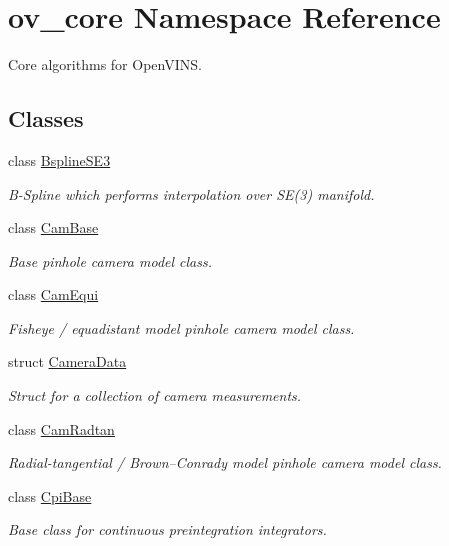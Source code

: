\hypertarget{namespaceov__core}{}\section{ov\+\_\+core Namespace Reference}
\label{namespaceov__core}


Core algorithms for Open\+V\+I\+NS.  


\subsection*{Classes}
\begin{DoxyCompactItemize}
\item 
class \hyperlink{classov__core_1_1BsplineSE3}{Bspline\+S\+E3}
\begin{DoxyCompactList}\small\item\em B-\/\+Spline which performs interpolation over S\+E(3) manifold. \end{DoxyCompactList}\item 
class \hyperlink{classov__core_1_1CamBase}{Cam\+Base}
\begin{DoxyCompactList}\small\item\em Base pinhole camera model class. \end{DoxyCompactList}\item 
class \hyperlink{classov__core_1_1CamEqui}{Cam\+Equi}
\begin{DoxyCompactList}\small\item\em Fisheye / equadistant model pinhole camera model class. \end{DoxyCompactList}\item 
struct \hyperlink{structov__core_1_1CameraData}{Camera\+Data}
\begin{DoxyCompactList}\small\item\em Struct for a collection of camera measurements. \end{DoxyCompactList}\item 
class \hyperlink{classov__core_1_1CamRadtan}{Cam\+Radtan}
\begin{DoxyCompactList}\small\item\em Radial-\/tangential / Brown–\+Conrady model pinhole camera model class. \end{DoxyCompactList}\item 
class \hyperlink{classov__core_1_1CpiBase}{Cpi\+Base}
\begin{DoxyCompactList}\small\item\em Base class for continuous preintegration integrators. \end{DoxyCompactList}\item 

\end{DoxyCompactItemize}
